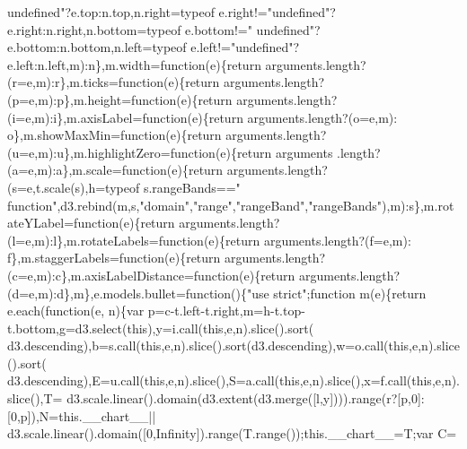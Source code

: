 \begin{DoxyCode}
{      undefined"}?e.top:n.top,n.right=typeof e.right!=\textcolor{stringliteral}{"undefined"}?e.right:n.right,n.bottom=typeof e.bottom!=\textcolor{stringliteral}{"
      undefined"}?e.bottom:n.bottom,n.left=typeof e.left!=\textcolor{stringliteral}{"undefined"}?e.left:n.left,m):n\},m.width=\textcolor{keyword}{function}(e)\{\textcolor{keywordflow}{return} 
      arguments.length?(r=e,m):r\},m.ticks=\textcolor{keyword}{function}(e)\{\textcolor{keywordflow}{return} arguments.length?(p=e,m):p\},m.height=\textcolor{keyword}{function}(e)\{\textcolor{keywordflow}{return} 
      arguments.length?(i=e,m):i\},m.axisLabel=\textcolor{keyword}{function}(e)\{\textcolor{keywordflow}{return} arguments.length?(o=e,m):
      o\},m.showMaxMin=\textcolor{keyword}{function}(e)\{\textcolor{keywordflow}{return} arguments.length?(u=e,m):u\},m.highlightZero=\textcolor{keyword}{function}(e)\{\textcolor{keywordflow}{return} arguments
      .length?(a=e,m):a\},m.scale=\textcolor{keyword}{function}(e)\{\textcolor{keywordflow}{return} arguments.length?(s=e,t.scale(s),h=typeof s.rangeBands==\textcolor{stringliteral}{"
      function"},d3.rebind(m,s,\textcolor{stringliteral}{"domain"},\textcolor{stringliteral}{"range"},\textcolor{stringliteral}{"rangeBand"},\textcolor{stringliteral}{"rangeBands"}),m):s\},m.rotateYLabel=\textcolor{keyword}{function}(e)\{\textcolor{keywordflow}{return} 
      arguments.length?(l=e,m):l\},m.rotateLabels=\textcolor{keyword}{function}(e)\{\textcolor{keywordflow}{return} arguments.length?(f=e,m):
      f\},m.staggerLabels=\textcolor{keyword}{function}(e)\{\textcolor{keywordflow}{return} arguments.length?(c=e,m):c\},m.axisLabelDistance=\textcolor{keyword}{function}(e)\{\textcolor{keywordflow}{return} 
      arguments.length?(d=e,m):d\},m\},e.models.bullet=\textcolor{keyword}{function}()\{\textcolor{stringliteral}{"use strict"};\textcolor{keyword}{function} m(e)\{\textcolor{keywordflow}{return} e.each(\textcolor{keyword}{function}(e,
      n)\{var p=c-t.left-t.right,m=h-t.top-t.bottom,g=d3.select(\textcolor{keyword}{this}),y=i.call(\textcolor{keyword}{this},e,n).slice().sort(
      d3.descending),b=s.call(\textcolor{keyword}{this},e,n).slice().sort(d3.descending),w=o.call(\textcolor{keyword}{this},e,n).slice().sort(
      d3.descending),E=u.call(\textcolor{keyword}{this},e,n).slice(),S=a.call(\textcolor{keyword}{this},e,n).slice(),x=f.call(\textcolor{keyword}{this},e,n).slice(),T=
      d3.scale.linear().domain(d3.extent(d3.merge([l,y]))).range(r?[p,0]:[0,p]),N=this.\_\_chart\_\_||
      d3.scale.linear().domain([0,Infinity]).range(T.range());this.\_\_chart\_\_=T;var C=

\end{DoxyCode}
